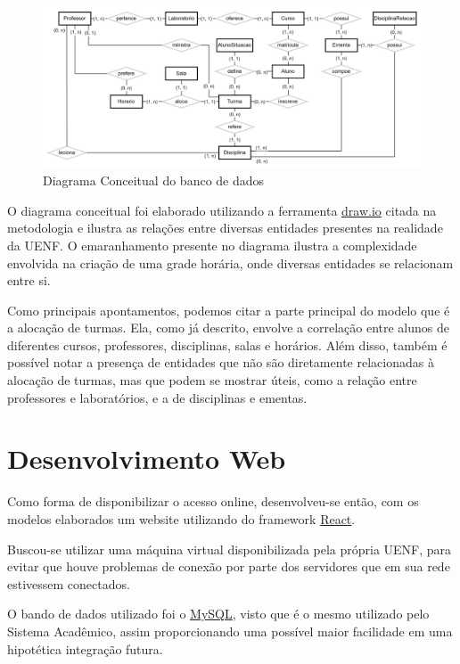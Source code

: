 \begin{figure}[htbp]\centering
  \caption{\label{fig:DiagramConceitual} Diagrama Conceitual do banco de dados}
  \includegraphics[scale=0.2]{files/img/DiagramaConceitual/DiagramaConceitualBranco.png}
\end{figure} %

O diagrama conceitual foi elaborado utilizando a ferramenta \href{https://www.drawio.com/}{draw.io} citada na metodologia e ilustra as relações entre diversas entidades presentes na realidade da UENF. O emaranhamento presente no diagrama ilustra a complexidade envolvida na criação de uma grade horária, onde diversas entidades se relacionam entre si.

Como principais apontamentos, podemos citar a parte principal do modelo que é a alocação de turmas. Ela, como já descrito, envolve a correlação entre alunos de diferentes cursos, professores, disciplinas, salas e horários. Além disso, também é possível notar a presença de entidades que não são diretamente relacionadas à alocação de turmas, mas que podem se mostrar úteis, como a relação entre professores e laboratórios, e a de disciplinas e ementas.

\section{Desenvolvimento Web} %

Como forma de disponibilizar o acesso online, desenvolveu-se então, com os modelos elaborados um website utilizando do framework \href{https://react.dev/}{React}.

Buscou-se utilizar uma máquina virtual disponibilizada pela própria UENF, para evitar que houve problemas de conexão por parte dos servidores que em sua rede estivessem conectados.

O bando de dados utilizado foi o \href{https://dev.mysql.com/}{MySQL}, visto que é o mesmo utilizado pelo Sistema Acadêmico, assim proporcionando uma possível maior facilidade em uma hipotética integração futura.



